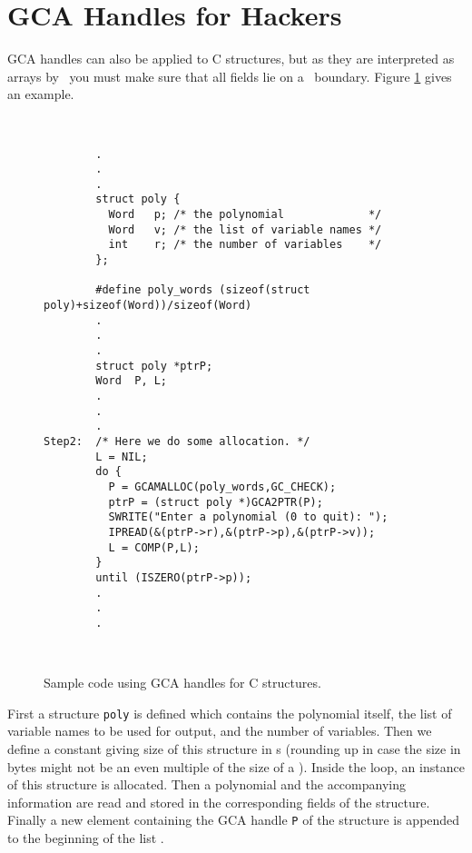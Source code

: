 \section{GCA Handles for Hackers}

GCA handles can also be applied to C structures, but as they are
interpreted as arrays by \saclib\ you must make sure that all fields lie on
a \Word\ boundary. Figure \ref{f:GCA2} gives an example.


\begin{figure}[htb]
\ \hrulefill\ \small
\begin{verbatim}
        .
        .
        .
        struct poly {
          Word   p; /* the polynomial             */
          Word   v; /* the list of variable names */
          int    r; /* the number of variables    */
        };

        #define poly_words (sizeof(struct poly)+sizeof(Word))/sizeof(Word)
        .
        .
        .
        struct poly *ptrP;
        Word  P, L;
        .
        .
        .
Step2:  /* Here we do some allocation. */
        L = NIL;
        do {
          P = GCAMALLOC(poly_words,GC_CHECK);
          ptrP = (struct poly *)GCA2PTR(P);
          SWRITE("Enter a polynomial (0 to quit): ");
          IPREAD(&(ptrP->r),&(ptrP->p),&(ptrP->v));
          L = COMP(P,L);
        }
        until (ISZERO(ptrP->p));
        .
        .
        .
\end{verbatim}
\ \hrulefill\ \normalsize
\caption{Sample code using GCA handles for C structures.}
\label{f:GCA2}
\end{figure}

First a structure {\tt poly} is defined which contains the polynomial
itself, the list of variable names to be used for output, and the number of
variables. Then we define a constant giving size of this structure in \Word
s (rounding up in case the size in bytes might not be an even multiple of
the size of a \Word). Inside the loop, an instance of this structure is
allocated. Then a polynomial and the accompanying information are read and
stored in the corresponding fields of the structure. Finally a new element
containing the GCA handle {\tt P} of the structure is appended to the
beginning of the list \ttL.

